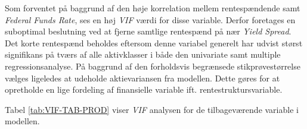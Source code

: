 \documentclass[
  a4paper,
  oneside]{memoir}
\begin{document}
\begin{table}[H]

\caption{\label{tab:VIF-TAB}Variance Inflation Factor analyse for det hidtidige system af variable.}
\centering
{}
\end{table}

Som forventet på baggrund af den høje korrelation mellem rentespændende samt \emph{Federal Funds Rate}, ses en høj \emph{VIF} værdi for disse variable. Derfor foretages en suboptimal beslutning ved at fjerne samtlige rentespænd på nær \emph{Yield Spread}. Det korte rentespænd beholdes eftersom denne variabel generelt har udvist størst signifikans på tværs af alle aktivklasser i både den univariate samt multiple regressionsanalyse. På baggrund af den forholdsvis begrænsede stikprøvestørrelse vælges ligeledes at udeholde aktievariansen fra modellen. Dette gøres for at opretholde en lige fordeling af finansielle variable ift. rentestruktursvariable.

Tabel \ref{tab:VIF-TAB-PROD} viser \emph{VIF} analysen for de tilbageværende variable i modellen.
\end{document}
